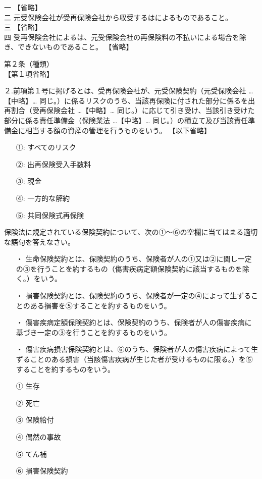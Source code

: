 \documentclass[report,gutter=10mm,fore-edge=10mm,uplatex,dvipdfmx]{jlreq}
\begin{document}
一 【省略】\\
二 元受保険会社が受再保険会社から収受するはによるものであること。\\
三 【省略】\\
四 受再保険会社によるは、元受保険会社の再保険料の不払いによる場合を除き、できないものであること。
【省略】

第２条（種類）\\
【第１項省略】

２.前項第１号に掲げるとは、受再保険会社が、元受保険契約（元受保険会社 …【中略】… 同じ。）に係るリスクのうち、当該再保険に付された部分に係るを出再割合（受再保険会社 …【中略】… 同じ。）に応じて引き受け、当該引き受けた部分に係る責任準備金（保険業法 …【中略】… 同じ。）の積立て及び当該責任準備金に相当する額の資産の管理を行うものをいう。
【以下省略】

\answer{}
\begin{itemize}
\item[ ①: ]  すべてのリスク
\item[ ②: ]  出再保険受入手数料
\item[ ③: ]  現金
\item[ ④: ]  一方的な解約
\item[ ⑤: ]  共同保険式再保険
\end{itemize}


保険法に規定されている保険契約について、次の①～⑥の空欄に当てはまる適切な語句を答えなさい。

\begin{itemize}
\item[ ・ ] 生命保険契約とは、保険契約のうち、保険者が人の①又は②に関し一定の③を行うことを約するもの（傷害疾病定額保険契約に該当するものを除く。）をいう。
\item[ ・ ] 損害保険契約とは、保険契約のうち、保険者が一定の④によって生ずることのある損害を⑤することを約するものをいう。
\item[ ・ ] 傷害疾病定額保険契約とは、保険契約のうち、保険者が人の傷害疾病に基づき一定の③を行うことを約するものをいう。
\item[ ・ ] 傷害疾病損害保険契約とは、⑥のうち、保険者が人の傷害疾病によって生ずることのある損害（当該傷害疾病が生じた者が受けるものに限る。）を⑤することを約するものをいう。
\end{itemize}

\answer{}
\begin{itemize}
\item[ ① ]  生存
\item[ ② ]  死亡
\item[ ③ ]  保険給付
\item[ ④ ]  偶然の事故
\item[ ⑤ ]  てん補
\item[ ⑥ ]  損害保険契約
\end{itemize}
\end{document}
